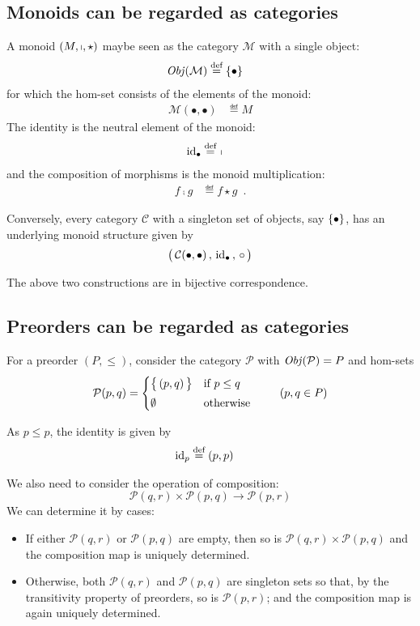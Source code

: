 \subsection{Monoids can be regarded as categories}

A monoid $(M, \shortmid, \star)$ maybe seen as the category $\mathcal M$ with
a single object:
\begin{align*}
\operatorname{\mathit{Obj}}(\mathcal M) &\stackrel{\text{def}}{=} \{  \bullet  \}
\end{align*}
for which the hom-set consists of the elements of the monoid:
\begin{align*}
\mathcal{M}(\bullet, \bullet) &\eqdef M
\end{align*}
The identity is the neutral element of the monoid:
\begin{align*}
\mathrm{id}_{ \bullet } &\stackrel{\text{def}}{=}\ \shortmid
\end{align*}
and the composition of morphisms is the monoid multiplication:
\begin{align*}
f \comp g &\eqdef f \star g
\enspace.
\end{align*}

Conversely, every category $\mathcal C$ with a singleton set of objects, say
$\{ \bullet \}$, has an underlying monoid structure given by
\[
  \big(\, \mathcal{C}(\bullet,\bullet) \,,\, \mathrm{id}_{ \bullet } \,,\, \circ \,\big)
\]

The above two constructions are in bijective correspondence.

\subsection{Preorders can be regarded as categories}

For a preorder $(P, \leq)$, consider the category $\mathcal P$ with
$\operatorname{\mathit{Obj}}(\mathcal P) = P$ and hom-sets
\[
\mathcal{P}(p, q)
= \begin{cases}
    \big\{ \, (p,q) \, \big\} & \text{if } p \leq q
    \\[1mm]
    \emptyset & \text{otherwise }
  \end{cases}
\qquad
(p,q \in P)
\]

As $p \leq p$, the identity is given by
\begin{align*}
\mathrm{id}_{ p } &\stackrel{\text{def}}{=} (p,p)
\end{align*}

We also need to consider the operation of composition:
\[
\mathcal{P}(q, r) \times \mathcal{P}(p, q) \to \mathcal{P}(p, r)
\]
We can determine it by cases:
\begin{itemize}
\item
If either $\mathcal{P}(q, r)$ or $\mathcal{P}(p, q)$ are empty, then so is
$\mathcal{P}(q, r) \times \mathcal{P}(p, q)$ and the composition map is
uniquely determined.

\item
Otherwise, both $\mathcal{P}(q, r)$ and $\mathcal{P}(p, q)$ are singleton
sets so that, by the transitivity property of preorders, so is
$\mathcal{P}(p, r)$; and the composition map is again uniquely determined.
\end{itemize}

